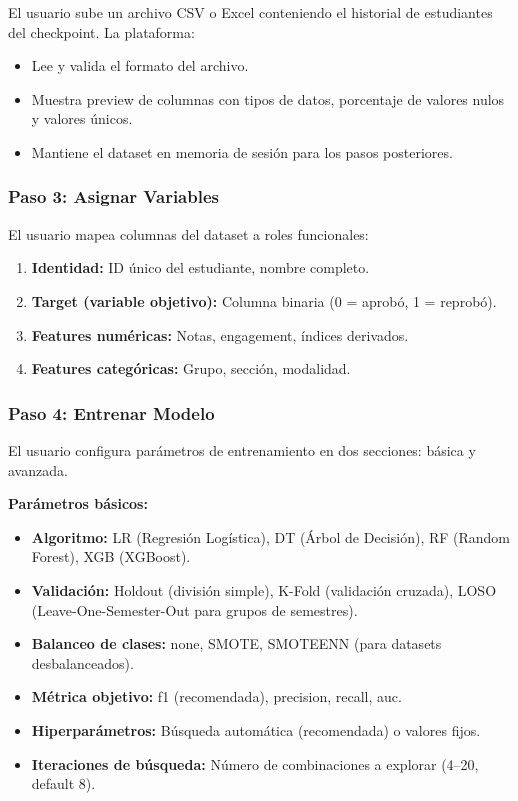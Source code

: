 \documentclass[12pt, letterpaper, openany]{report}
\begin{document}
El usuario sube un archivo CSV o Excel conteniendo el historial de estudiantes del checkpoint. La plataforma:

\begin{itemize}
    \item Lee y valida el formato del archivo.
    \item Muestra preview de columnas con tipos de datos, porcentaje de valores nulos y valores únicos.
    \item Mantiene el dataset en memoria de sesión para los pasos posteriores.
\end{itemize}

\subsubsection*{Paso 3: Asignar Variables}

El usuario mapea columnas del dataset a roles funcionales:

\begin{enumerate}
    \item \textbf{Identidad:} ID único del estudiante, nombre completo.
    \item \textbf{Target (variable objetivo):} Columna binaria (0 = aprobó, 1 = reprobó).
    \item \textbf{Features numéricas:} Notas, engagement, índices derivados.
    \item \textbf{Features categóricas:} Grupo, sección, modalidad.
\end{enumerate}

\subsubsection*{Paso 4: Entrenar Modelo}

El usuario configura parámetros de entrenamiento en dos secciones: básica y avanzada.

\textbf{Parámetros básicos:}

\begin{itemize}
    \item \textbf{Algoritmo:} LR (Regresión Logística), DT (Árbol de Decisión), RF (Random Forest), XGB (XGBoost).
    \item \textbf{Validación:} Holdout (división simple), K-Fold (validación cruzada), LOSO (Leave-One-Semester-Out para grupos de semestres).
    \item \textbf{Balanceo de clases:} none, SMOTE, SMOTEENN (para datasets desbalanceados).
    \item \textbf{Métrica objetivo:} f1 (recomendada), precision, recall, auc.
    \item \textbf{Hiperparámetros:} Búsqueda automática (recomendada) o valores fijos.
    \item \textbf{Iteraciones de búsqueda:} Número de combinaciones a explorar (4--20, default 8).
\end{itemize}
\end{document}
